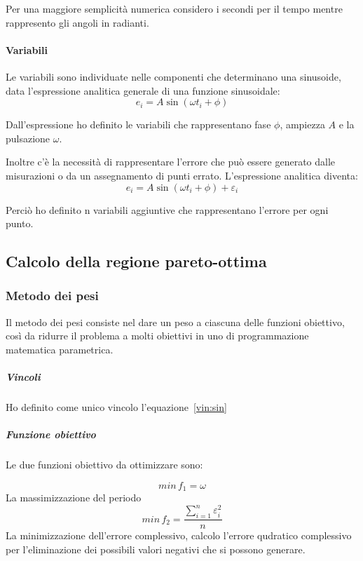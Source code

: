 \documentclass[a4paper,12pt]{report}
\begin{document}
Per una maggiore semplicità numerica considero i secondi per il tempo mentre rappresento gli angoli in radianti.


\paragraph{Variabili}
Le variabili sono individuate nelle componenti che determinano una sinusoide, data l'espressione analitica generale di una funzione sinusoidale:
\begin{equation}
e_i = A\sin(\omega t_i + \phi)
\end{equation}

Dall'espressione ho definito le variabili che rappresentano fase $ \phi $, ampiezza $ A $  e la pulsazione $\omega$.

Inoltre c'è la necessità di rappresentare l'errore che può essere generato dalle misurazioni o da un assegnamento di punti errato. L'espressione analitica diventa:
\begin{equation}
\label{vin:sin}
e_i = A\sin(\omega t_i + \phi) + \varepsilon_i
\end{equation}

Perciò ho definito n variabili aggiuntive che rappresentano l'errore per ogni punto.
\subsection{Calcolo della regione pareto-ottima}

\subsubsection{Metodo dei pesi}
Il metodo dei pesi consiste nel dare un peso a ciascuna delle funzioni obiettivo, così da ridurre il problema a molti obiettivi in uno di programmazione matematica parametrica.

\subparagraph{Vincoli}
Ho definito come unico vincolo l'equazione~\eqref{vin:sin}

\subparagraph{Funzione obiettivo}
Le due funzioni obiettivo da ottimizzare sono:

\begin{equation}
\label{fo:periodo}
min \, f_1 = \omega
\end{equation}
La massimizzazione del periodo
\begin{equation}
\label{fo:errore}
min \, f_2 = \frac{\sum_{i=1}^n \varepsilon_i^2}{n}
\end{equation}
La minimizzazione dell'errore complessivo, calcolo l'errore qudratico complessivo per l'eliminazione dei possibili valori negativi che si possono generare.
\end{document}

